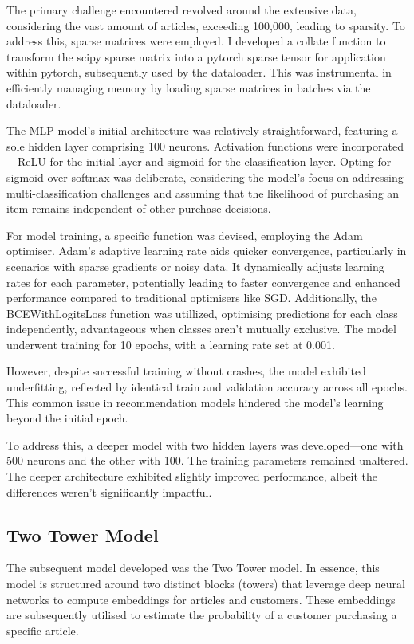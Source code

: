 \documentclass[conference,compsoc]{IEEEtran}
\begin{document}
The primary challenge encountered revolved around the extensive data, considering the vast amount of articles, exceeding 100,000, leading to sparsity. To address this, sparse matrices were employed. I developed a collate function to transform the scipy sparse matrix into a pytorch sparse tensor for application within pytorch, subsequently used by the dataloader. This was instrumental in efficiently managing memory by loading sparse matrices in batches via the dataloader.

The MLP model's initial architecture was relatively straightforward, featuring a sole hidden layer comprising 100 neurons. Activation functions were incorporated—ReLU for the initial layer and sigmoid for the classification layer. 
Opting for sigmoid over softmax was deliberate, considering the model's focus on addressing multi-classification challenges and assuming that the likelihood of purchasing an item remains independent of other purchase decisions.

For model training, a specific function was devised, employing the Adam optimiser. Adam's adaptive learning rate aids quicker convergence, particularly in scenarios with sparse gradients or noisy data. It dynamically adjusts learning rates for each parameter, potentially leading to faster convergence and enhanced performance compared to traditional optimisers like SGD. Additionally, the BCEWithLogitsLoss function was utillized, optimising predictions for each class independently, advantageous when classes aren't mutually exclusive. The model underwent training for 10 epochs, with a learning rate set at 0.001.

However, despite successful training without crashes, the model exhibited underfitting, reflected by identical train and validation accuracy across all epochs. This common issue in recommendation models hindered the model's learning beyond the initial epoch.

To address this, a deeper model with two hidden layers was developed—one with 500 neurons and the other with 100. The training parameters remained unaltered. The deeper architecture exhibited slightly improved performance, albeit the differences weren't significantly impactful.

\subsection{Two Tower Model}
The subsequent model developed was the Two Tower model. In essence, this model is structured around two distinct blocks (towers) that leverage deep neural networks to compute embeddings for articles and customers. These embeddings are subsequently utilised to estimate the probability of a customer purchasing a specific article.
\end{document}
